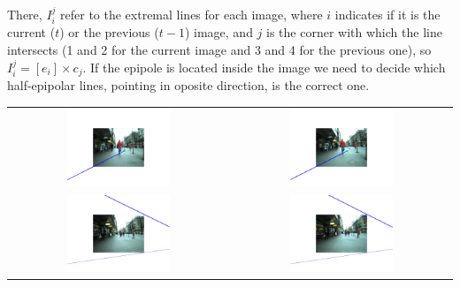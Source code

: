 There, $I_i^j$ refer to the extremal lines for each image, where $i$ indicates if it is the current ($t$) or the previous ($t - 1$) image, and $j$ is the corner with which the line intersects (1 and 2 for the current image and 3 and 4 for the previous one), so $I_i^j = [e_i] \times c_j$. If the epipole is located inside the image we need to decide which half-epipolar lines, pointing in oposite direction, is the correct one. 

\begin{center}
\begin{tabular}{cc}
\includegraphics[width=0.49\textwidth]{epipolarExtremeLeft1}\label{fig:cp04_epipolarExtremeLeft1} &
\includegraphics[width=0.49\textwidth]{epipolarExtremeRight1}\label{fig:cp04_epipolarExtremeRight1} \\
\includegraphics[width=0.49\textwidth]{epipolarExtremeLeft2}\label{fig:cp04_epipolarExtremeLeft2} &
\includegraphics[width=0.49\textwidth]{epipolarExtremeRight2}\label{fig:cp04_epipolarExtremeRight2} \\

\end{tabular}
\end{center}
